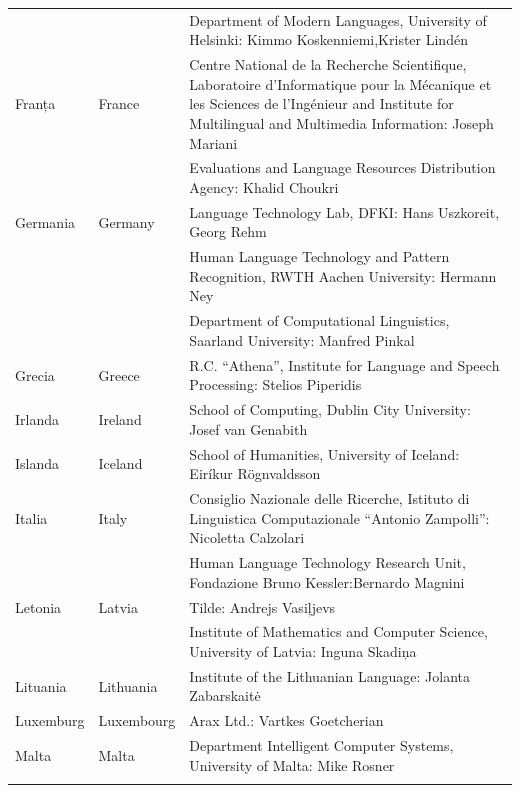 \begin{longtable}{@{}llp{113mm}@{}}
  & & Department of Modern Languages, University of Helsinki: Kimmo Koskenniemi,\newline Krister Lindén \\ \addlinespace
  Franța & \textcolor{grey1}{France} & Centre National de la Recherche Scientifique, Laboratoire d'Informatique pour la Mécanique et les Sciences de l'Ingénieur and Institute for Multilingual and Multimedia Information: Joseph Mariani \\ \addlinespace
  & & Evaluations and Language Resources Distribution Agency: Khalid Choukri\\ \addlinespace 
  Germania & \textcolor{grey1}{Germany} & Language Technology Lab, DFKI: Hans Uszkoreit, Georg Rehm\\ \addlinespace
  & & Human Language Technology and Pattern Recognition, RWTH Aachen University: Hermann Ney \\ \addlinespace
  & & Department of Computational Linguistics, Saarland University: Manfred Pinkal\\ \addlinespace 
  Grecia & \textcolor{grey1}{Greece} & R.C. “Athena”, Institute for Language and Speech Processing: Stelios Piperidis\\ \addlinespace
  Irlanda & \textcolor{grey1}{Ireland} & School of Computing, Dublin City University: Josef van Genabith\\ \addlinespace
  Islanda & \textcolor{grey1}{Iceland} & School of Humanities, University of Iceland: Eiríkur Rögnvaldsson\\ \addlinespace
  Italia & \textcolor{grey1}{Italy} & Consiglio Nazionale delle Ricerche, Istituto di Linguistica Computazionale “Antonio Zampolli”: Nicoletta Calzolari\\ \addlinespace
& & Human Language Technology Research Unit, Fondazione Bruno Kessler:\newline Bernardo Magnini\\ \addlinespace 
  Letonia & \textcolor{grey1}{Latvia} & Tilde: Andrejs Vasiļjevs\\ \addlinespace 
  & & Institute of Mathematics and Computer Science, University of Latvia: Inguna Skadiņa\\ \addlinespace
  Lituania & \textcolor{grey1}{Lithuania} & Institute of the Lithuanian Language: Jolanta Zabarskaitė\\ \addlinespace
  Luxemburg & \textcolor{grey1}{Luxembourg} & Arax Ltd.: Vartkes Goetcherian\\ \addlinespace
  Malta & \textcolor{grey1}{Malta} & Department Intelligent Computer Systems, University of Malta: Mike Rosner\\ \addlinespace

\end{longtable}
